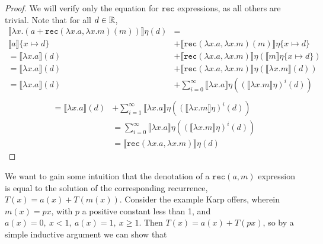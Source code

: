  \begin{proof}
 We will verify only the equation for $\texttt{rec}$ expressions, as all others are trivial.
 Note that for all $d \in \mathbb{R}$,
 \begin{align*}
 \llbracket \lambda x.(a + \texttt{rec}(\lambda x.a, \lambda x.m)(m)) \rrbracket \eta(d)
 &= \\  
  \llbracket a \rrbracket\{x\mapsto d\} &+ \llbracket \texttt{rec}(\lambda x.a, \lambda x.m)(m)\rrbracket\eta
 \{x\mapsto d\} \\
 = \llbracket \lambda x.a\rrbracket(d) &+ \llbracket\texttt{rec}(\lambda x.a, \lambda x.m)\rrbracket\eta
 (\llbracket m \rrbracket\eta\{x \mapsto d\}) \\
 =  \llbracket \lambda x.a\rrbracket(d) &+ \llbracket\texttt{rec}(\lambda x.a, \lambda x.m)\rrbracket\eta
 (\llbracket \lambda x.m \rrbracket(d)) \\
 = \llbracket \lambda x.a\rrbracket(d) &+ \sum_{i=0}^{\infty} \llbracket \lambda x.a\rrbracket\eta
 ((\llbracket \lambda x.m \rrbracket\eta)^i (d)) \\
 \end{align*}
 \begin{align*}
 = \llbracket \lambda x.a\rrbracket(d) &+ \sum_{i=1}^{\infty} \llbracket \lambda x.a\rrbracket\eta
 ((\llbracket \lambda x.m\rrbracket\eta)^i (d)) \\
&= \sum_{i=0}^\infty \llbracket \lambda x.a \rrbracket\eta ((\llbracket \lambda x.m\rrbracket\eta)^i(d)) \\
&=  \llbracket \texttt{rec}(\lambda x.a, \lambda x.m) \rrbracket \eta (d)
\end{align*}
\end{proof}

We want to gain some intuition that the denotation of a $\texttt{rec}(a,m)$ expression is equal to the solution of the 
corresponding recurrence, $T(x) = a(x) + T(m(x))$.
Consider the example Karp offers, wherein $m(x) = px$, with $p$ a
positive constant less than 1, and $a(x) = 0, \ x < 1, \ a(x) = 1, \ x \geq 1$.
Then $T(x) = a(x) + T(px)$, so by a simple inductive argument we can show that 

